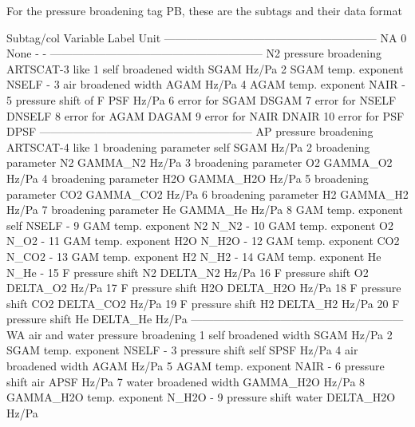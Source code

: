 For the pressure broadening tag PB, these are the subtags and their data format
\begin{code}    
Subtag/col  Variable                        Label    Unit
---------------------------------------------------------
       NA
        0  None                                 -       -
---------------------------------------------------------
       N2  pressure broadening ARTSCAT-3 like
        1  self broadened width             SGAM    Hz/Pa
        2  SGAM temp. exponent             NSELF        -
        3  air broadened width              AGAM    Hz/Pa
        4  AGAM temp. exponent              NAIR        -
        5  pressure shift of F               PSF    Hz/Pa
        6  error for SGAM                  DSGAM    %
        7  error for NSELF                DNSELF    %
        8  error for AGAM                  DAGAM    %
        9  error for NAIR                  DNAIR    %
       10  error for PSF                    DPSF    %
---------------------------------------------------------
       AP  pressure broadening ARTSCAT-4 like
        1   broadening parameter self        SGAM   Hz/Pa
        2   broadening parameter N2      GAMMA_N2   Hz/Pa
        3   broadening parameter O2      GAMMA_O2   Hz/Pa
        4   broadening parameter H2O    GAMMA_H2O   Hz/Pa
        5   broadening parameter CO2    GAMMA_CO2   Hz/Pa
        6   broadening parameter H2      GAMMA_H2   Hz/Pa
        7   broadening parameter He      GAMMA_He   Hz/Pa
        8   GAM temp. exponent self         NSELF       -
        9   GAM temp. exponent N2            N_N2       -
       10   GAM temp. exponent O2            N_O2       -
       11   GAM temp. exponent H2O          N_H2O       -
       12   GAM temp. exponent CO2          N_CO2       -
       13   GAM temp. exponent H2            N_H2       -
       14   GAM temp. exponent He            N_He       -
       15   F pressure shift N2          DELTA_N2   Hz/Pa
       16   F pressure shift O2          DELTA_O2   Hz/Pa   
       17   F pressure shift H2O        DELTA_H2O   Hz/Pa   
       18   F pressure shift CO2        DELTA_CO2   Hz/Pa   
       19   F pressure shift H2          DELTA_H2   Hz/Pa   
       20   F pressure shift He          DELTA_He   Hz/Pa
---------------------------------------------------------
       WA  air and water pressure broadening
        1  self broadened width             SGAM    Hz/Pa
        2  SGAM temp. exponent             NSELF        -
        3  pressure shift self              SPSF    Hz/Pa
        4  air broadened width              AGAM    Hz/Pa
        5  AGAM temp. exponent              NAIR        -
        6  pressure shift air               APSF    Hz/Pa
        7  water broadened width       GAMMA_H2O    Hz/Pa
        8  GAMMA_H2O temp. exponent        N_H2O        -
        9  pressure shift water        DELTA_H2O    Hz/Pa
\end{code}

